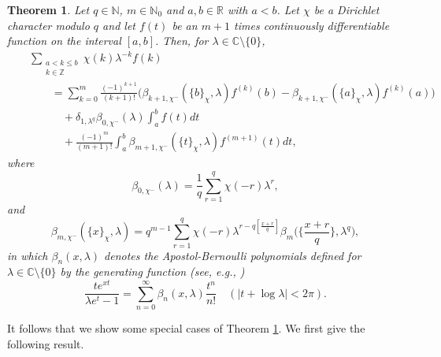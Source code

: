 \documentclass[reqno]{amsart}
\numberwithin{equation}{section}
\newtheorem{theorem}[thm]{Theorem}
\begin{document}
\begin{theorem}\label{thm2.1} Let $q\in\mathbb{N}$, $m\in\mathbb{N}_{0}$ and $a,b\in\mathbb{R}$ with $a<b$. Let $\chi$ be a Dirichlet character modulo $q$ and let $f(t)$ be an $m+1$
times continuously differentiable function on the interval $[a,b]$. Then, for $\lambda\in\mathbb{C}\setminus\{0\}$,
\begin{eqnarray}\label{eq2.1}
&&\sum_{\substack{a<k\leqslant b\\k\in\mathbb{Z}}}\chi(k)\lambda^{-k}f(k)\nonumber\\
&&\qquad=\sum_{k=0}^{m}\frac{(-1)^{k+1}}{(k+1)!}\bigl(\beta_{k+1,\chi^{-}}(\{b\}_{\chi},\lambda)f^{(k)}(b)-\beta_{k+1,\chi^{-}}(\{a\}_{\chi},\lambda)f^{(k)}(a)\bigl)\nonumber\\
&&\qquad\quad+\delta_{1,\lambda^{q}}\beta_{0,\chi^{-}}(\lambda)\int_{a}^{b}f(t)dt\nonumber\\
&&\qquad\quad+\frac{(-1)^{m}}{(m+1)!}\int_{a}^{b}\beta_{m+1,\chi^{-}}(\{t\}_{\chi},\lambda)f^{(m+1)}(t)dt,
\end{eqnarray}
where
\begin{equation*}
\beta_{0,\chi^{-}}(\lambda)=\frac{1}{q}\sum_{r=1}^{q}\chi(-r)\lambda^{r},
\end{equation*}
and
\begin{equation*}
\beta_{m,\chi^{-}}(\{x\}_{\chi},\lambda)=q^{m-1}\sum_{r=1}^{q}\chi(-r)\lambda^{r-q[\frac{x+r}{q}]}\beta_{m}\biggl(\biggl\{\frac{x+r}{q}\biggl\},\lambda^{q}\biggl),
\end{equation*}
in which $\beta_{n}(x,\lambda)$ denotes the Apostol-Bernoulli polynomials defined for $\lambda\in\mathbb{C}\setminus\{0\}$ by the generating function (see, e.g., \cite{apostol2})
\begin{equation}\label{eq2.2}
\frac{te^{xt}}{\lambda e^{t}-1}=\sum_{n=0}^{\infty}
\beta_{n}(x,\lambda)\frac{t^{n}}{n!}\quad(|t+\log\lambda|<2\pi).
\end{equation}
\end{theorem}

It follows that we show some special cases of Theorem \ref{thm2.1}. We first give the following result.
\end{document}
